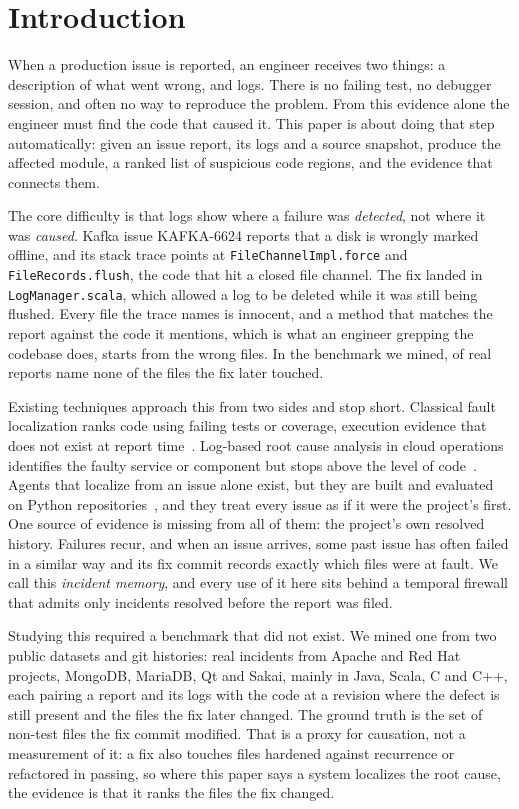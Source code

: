 \section{Introduction}
\label{sec:intro}

When a production issue is reported, an engineer receives two things: a
description of what went wrong, and logs. There is no failing test, no
debugger session, and often no way to reproduce the problem. From this
evidence alone the engineer must find the code that caused it. This
paper is about doing that step automatically: given an issue report,
its logs and a source snapshot, produce the affected module, a ranked
list of suspicious code regions, and the evidence that connects them.

The core difficulty is that logs show where a failure was
\emph{detected}, not where it was \emph{caused}. Kafka issue KAFKA-6624
reports that a disk is wrongly marked offline, and its stack trace
points at \texttt{FileChannelImpl.force} and \texttt{FileRecords.flush},
the code that hit a closed file channel. The fix landed in
\texttt{LogManager.scala}, which allowed a log to be deleted while it
was still being flushed. Every file the trace names is innocent, and a
method that matches the report against the code it mentions, which is
what an engineer grepping the codebase does, starts from the wrong
files. In the benchmark we mined, \nHardPct{} of real reports name none
of the files the fix later touched.

Existing techniques approach this from two sides and stop short.
Classical fault localization ranks code using failing tests or
coverage, execution evidence that does not exist at report
time~\cite{just2014defects4j,rafi2024multiagent}. Log-based root cause
analysis in cloud operations identifies the faulty service or
component but stops above the level of code~\cite{wang2024rcagent}.
Agents that localize from an issue alone exist, but they are built and
evaluated on Python repositories~\cite{chen2025locagent,jiang2025cosil},
and they treat every issue as if it were the project's first. One source
of evidence is missing from all of them: the project's own resolved
history. Failures recur, and when an issue arrives, some past issue has
often failed in a similar way and its fix commit records exactly which
files were at fault. We call this \emph{incident memory}, and every use
of it here sits behind a temporal firewall that admits only incidents
resolved before the report was filed.

Studying this required a benchmark that did not exist. We mined one
from two public datasets and \nProjects{} git histories: \nInstances{}
real incidents from Apache and Red Hat projects, MongoDB, MariaDB, Qt
and Sakai, mainly in Java, Scala, C and C++, each pairing a report and
its logs with
the code at a revision where the defect is still present and the files
the fix later changed. The ground truth is the set of non-test files
the fix commit modified. That is a proxy for causation, not a
measurement of it: a fix also touches files hardened against
recurrence or refactored in passing, so where this paper says a system
localizes the root cause, the evidence is that it ranks the files the
fix changed.

